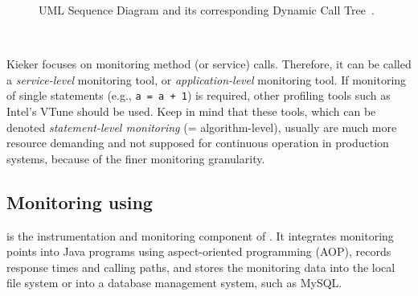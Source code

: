 \documentclass[a4paper,12pt]{scrartcl}
\begin{document}
\begin{figure}
\centering
{}
\hspace{1cm}
\caption{UML Sequence Diagram and its corresponding Dynamic Call Tree~\citep{RohrVanHoornGieseckeMatevskaHasselbring08TraceContextSensitivePerformanceModelsFromMonitoringDataOfSoftwareSystems}.
}\label{visualizationExample1}
\end{figure}

\

Kieker focuses on monitoring method (or service) calls. Therefore, it can be called a \textit{service-level} monitoring tool, or \textit{application-level} monitoring tool. If monitoring of single statements (e.g., {\small \texttt{a = a + 1}}) is required, other profiling tools such as Intel's VTune should be used. Keep in mind that these tools, which can be denoted \textit{statement-level monitoring} (= algorithm-level), usually are much more resource demanding and not supposed for continuous operation in production systems, because of the finer monitoring granularity.

\subsection{Monitoring using \tpmon{}}

\tpmon{} is the instrumentation and monitoring component of \kieker{}. It integrates monitoring points into Java programs using aspect-oriented programming (AOP), records response times and calling paths, and stores the monitoring data into the local file system or into a database management system, such as MySQL.
\end{document}
